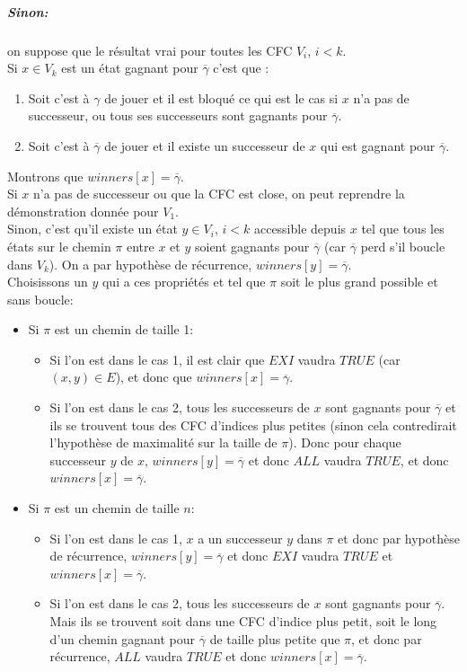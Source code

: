 \documentclass[10pt,a4paper]{article}
\begin{document}
\subparagraph{Sinon:} on suppose que le résultat vrai pour toutes les CFC $V_i$, $i < k$.
\\
Si $x \in V_k$ est un état gagnant pour $\overline{\gamma}$ c'est que :
\begin{enumerate}
	\item Soit c'est à $\gamma$ de jouer et il est bloqué ce qui est le cas si $x$ n'a pas de successeur, ou tous ses successeurs sont gagnants pour $\overline{\gamma}$.
	\item Soit c'est à $\overline{\gamma}$ de jouer et il existe un successeur de $x$ qui est gagnant pour $\overline{\gamma}$.
\end{enumerate}
Montrons que $winners[x] = \overline{\gamma}$.\\
Si $x$ n'a pas de successeur ou que la CFC est close, on peut reprendre la démonstration donnée pour $V_1$.\\
Sinon, c'est qu'il existe un état $y \in V_i$, $ i < k$ accessible depuis $x$ tel que tous les états sur le chemin $\pi$ entre $x$ et $y$ soient gagnants pour $\overline{\gamma}$ (car $\overline{\gamma}$ perd s'il boucle dans $V_k$). On a par hypothèse de récurrence, $winners[y] = \overline{\gamma}$.\\
Choisissons un $y$ qui a ces propriétés et tel que $\pi$ soit le plus grand possible et sans boucle:
\begin{itemize}
	\item Si $\pi$ est un chemin de taille 1:
	\begin{itemize}
		\item Si l'on est dans le cas 1, il est clair que $EXI$ vaudra $TRUE$ (car $(x,y) \in E$), et donc que $winners[x] = \overline{\gamma}$.
		\item Si l'on est dans le cas 2, tous les successeurs de $x$ sont gagnants pour $\overline{\gamma}$ et ils se trouvent tous des CFC d'indices plus petites (sinon cela contredirait l'hypothèse de maximalité sur la taille de $\pi$). Donc pour chaque successeur $y$ de $x$, $winners[y] = \overline{\gamma}$ et donc $ALL$ vaudra $TRUE$, et donc $winners[x] = \overline{\gamma}$.
	\end{itemize}
	\item Si $\pi$ est un chemin de taille $n$:
	\begin{itemize}
		\item Si l'on est dans le cas 1, $x$ a un successeur $y$ dans $\pi$ et donc par hypothèse de récurrence, $winners[y] = \overline{\gamma}$ et donc $EXI$ vaudra $TRUE$ et $winners[x] = \overline{\gamma}$.
		\item Si l'on est dans le cas 2, tous les successeurs de $x$ sont gagnants pour $\overline{\gamma}$. Mais ils se trouvent soit dans une CFC d'indice plus petit, soit le long d'un chemin gagnant pour $\overline{\gamma}$ de taille plus petite que $\pi$, et donc par récurrence, $ALL$ vaudra $TRUE$ et donc $winners[x] = \overline{\gamma}$.
	\end{itemize}
\end{itemize}
\end{document}
